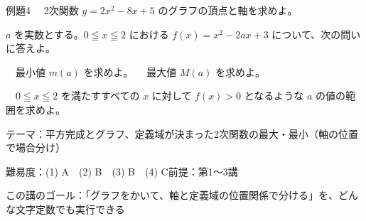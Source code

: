 \documentclass[paper=b5j, fontsize=8pt, fleqn, twoside]{jlreq}
\begin{document}
\begin{ascolorbox4A}[出典：オリジナル]{例題4}
  　2次関数 $y=2x^2-8x+5$ のグラフの頂点と軸を求めよ。\par
  $a$ を実数とする。$0\leqq x\leqq 2$ における $f(x)=x^2-2ax+3$ について、次の問いに答えよ。\par
  　最小値 $m(a)$ を求めよ。\qquad
  　最大値 $M(a)$ を求めよ。\par
  　$0\leqq x\leqq2$ を満たすすべての $x$ に対して $f(x)>0$ となるような $a$ の値の範囲を求めよ。
\end{ascolorbox4A}

\begin{Data}
  テーマ：平方完成とグラフ、定義域が決まった2次関数の最大・最小（軸の位置で場合分け）\par
  難易度：(1) A　(2) B　(3) B　(4) C\quad 前提：第1〜3講\par
  この講のゴール：「グラフをかいて、軸と定義域の位置関係で分ける」を、どんな文字定数でも実行できる
\end{Data}
\end{document}
